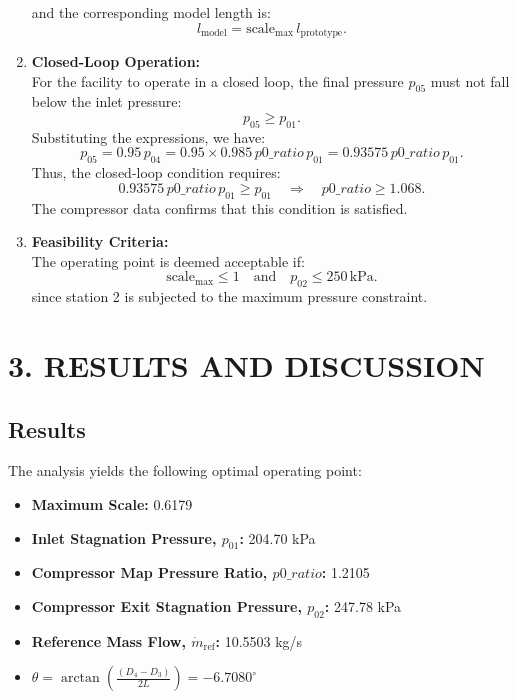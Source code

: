 \documentclass[12pt]{article}
\begin{document}
\begin{enumerate}
    and the corresponding model length is:
    \[
    l_{\text{model}} = \text{scale}_{\text{max}}\,l_{\text{prototype}}.
    \]


    


    \item \textbf{Closed-Loop Operation:} \\
For the facility to operate in a closed loop, the final pressure \( p_{05} \) must not fall below the inlet pressure:
\[
p_{05} \ge p_{01}.
\]
Substituting the expressions, we have:
\[
p_{05} = 0.95 \, p_{04} = 0.95 \times 0.985 \, p0\_ratio \, p_{01} = 0.93575 \, p0\_ratio \, p_{01}.
\]
Thus, the closed-loop condition requires:
\[
0.93575 \, p0\_ratio \, p_{01} \ge p_{01} \quad \Rightarrow \quad p0\_ratio \ge 1.068.
\]
The compressor data confirms that this condition is satisfied.

    \item \textbf{Feasibility Criteria:} \\
    The operating point is deemed acceptable if:
    \[
    \text{scale}_{\text{max}} \le 1 \quad \text{and} \quad p_{02} \le 250\,\text{kPa}.
    \]
    since station 2 is subjected to the maximum pressure constraint.
\end{enumerate}

\section*{\large{3. RESULTS AND DISCUSSION}}

\subsection*{Results}
The analysis yields the following optimal operating point:
\begin{itemize}
    \item \textbf{Maximum Scale:} 0.6179
    \item \textbf{Inlet Stagnation Pressure, \(p_{01}\):} 204.70 kPa
    \item \textbf{Compressor Map Pressure Ratio, \(p0\_ratio\):} 1.2105
    \item \textbf{Compressor Exit Stagnation Pressure, \(p_{02}\):} 247.78 kPa
    \item \textbf{Reference Mass Flow, \(\dot{m}_{\text{ref}}\):} 10.5503 kg/s
    \item \(\theta = \arctan\left(\frac{(D_4-D_3)}{2L}\right) = -6.7080^\circ\)
\end{itemize}
\end{document}
